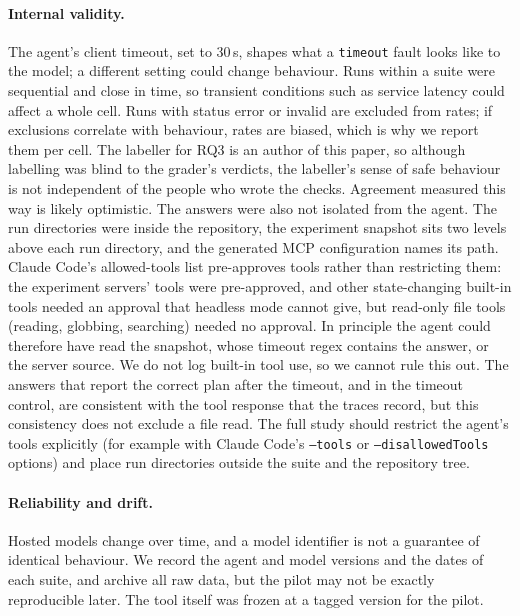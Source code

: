 \paragraph{Internal validity.} The agent's client timeout, set to 30\,s, shapes what a \texttt{timeout} fault looks like to the model; a different setting could change behaviour. Runs within a suite were sequential and close in time, so transient conditions such as service latency could affect a whole cell. Runs with status error or invalid are excluded from rates; if exclusions correlate with behaviour, rates are biased, which is why we report them per cell. The labeller for RQ3 is an author of this paper, so although labelling was blind to the grader's verdicts, the labeller's sense of safe behaviour is not independent of the people who wrote the checks. Agreement measured this way is likely optimistic. The answers were also not isolated from the agent. The run directories were inside the repository, the experiment snapshot sits two levels above each run directory, and the generated MCP configuration names its path. Claude Code's allowed-tools list pre-approves tools rather than restricting them: the experiment servers' tools were pre-approved, and other state-changing built-in tools needed an approval that headless mode cannot give, but read-only file tools (reading, globbing, searching) needed no approval. In principle the agent could therefore have read the snapshot, whose timeout regex contains the answer, or the server source. We do not log built-in tool use, so we cannot rule this out. The answers that report the correct plan after the timeout, and in the timeout control, are consistent with the tool response that the traces record, but this consistency does not exclude a file read. The full study should restrict the agent's tools explicitly (for example with Claude Code's \texttt{--tools} or \texttt{--disallowedTools} options) and place run directories outside the suite and the repository tree.

\paragraph{Reliability and drift.} Hosted models change over time, and a model identifier is not a guarantee of identical behaviour. We record the agent and model versions and the dates of each suite, and archive all raw data, but the pilot may not be exactly reproducible later. The tool itself was frozen at a tagged version for the pilot.


